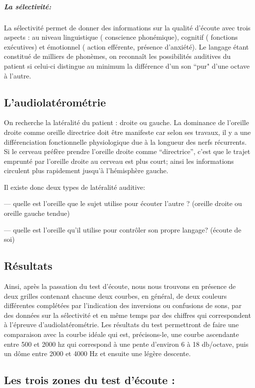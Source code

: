 \subparagraph{La sélectivité: }


La sélectivité permet de donner des informations sur la
qualité d'écoute avec trois aspects : au niveau linguistique ( conscience
phonémique), cognitif ( fonctions exécutives) et émotionnel ( action
efférente, présence d'anxiété).
Le langage étant constitué de milliers de phonèmes, on reconnaît les possibilités auditives du patient si celui-ci  distingue au minimum la différence d'un son ``pur" d'une octave à l'autre.  


\subsection{L'audiolatérométrie}

On recherche la latéralité du patient : droite ou gauche. La dominance
de l'oreille droite comme oreille directrice doit être manifeste car
selon ses travaux, il y a une différenciation fonctionnelle
physiologique due à la longueur des nerfs récurrents. 
Si le cerveau préfère prendre l'oreille droite comme
``directrice'', c'est que le trajet emprunté par l'oreille droite au cerveau est plus
court;
ainsi
les informations circulent plus rapidement jusqu'à l'hémisphère gauche.

Il existe donc  deux types de latéralité auditive:


--- quelle est l'oreille que le sujet utilise pour écouter l'autre ?
(oreille droite ou oreille gauche tendue)

--- quelle est l'oreille qu'il utilise pour contrôler son propre langage?
(écoute de soi)


 \subsection{Résultats}
 
Ainsi, après la passation du test d\textquoteright écoute, nous nous
trouvons en présence de deux grilles contenant chacune deux courbes,
en général, de deux couleurs différentes complétées par l'indication
des inversions ou confusions de sons, par des données sur la sélectivité
et en même temps par des chiffres qui correspondent à l'épreuve d'audiolatérométrie.
Les résultats du test permettront de faire une comparaison avec la
courbe idéale qui est, précisons-le, une courbe ascendante entre 500 et 2000
hz qui correspond à une pente d\textquoteright environ 6 à 18 db/octave,
puis un dôme entre 2000 et 4000 Hz et ensuite une légère descente. 

\subsection{Les trois zones du test d'écoute : }

